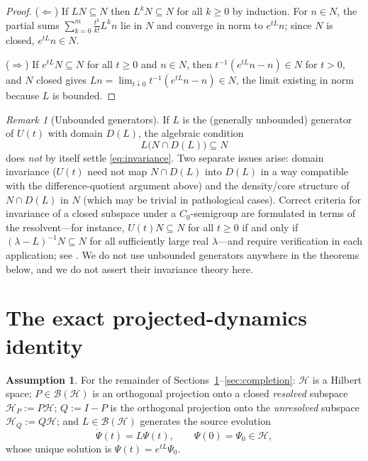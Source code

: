 \documentclass[11pt,reqno]{amsart}
\numberwithin{equation}{section}
\theoremstyle{plain}
\theoremstyle{definition}
\newtheorem{assumption}[theorem]{Assumption}
\theoremstyle{remark}
\newtheorem{remark}[theorem]{Remark}
\newcommand{\HP}{\mathcal{H}_{P}}
\newcommand{\HQ}{\mathcal{H}_{Q}}
\begin{document}
\begin{proof}
($\Leftarrow$) If $LN\subseteq N$ then $L^{k}N\subseteq N$ for all $k\ge0$ by induction. For
$n\in N$, the partial sums $\sum_{k=0}^{m}\tfrac{t^{k}}{k!}L^{k}n$ lie in $N$ and converge in
norm to $e^{tL}n$; since $N$ is closed, $e^{tL}n\in N$.

($\Rightarrow$) If $e^{tL}N\subseteq N$ for all $t\ge0$ and $n\in N$, then
$t^{-1}(e^{tL}n-n)\in N$ for $t>0$, and $N$ closed gives
$Ln=\lim_{t\downarrow0}t^{-1}(e^{tL}n-n)\in N$, the limit existing in norm because $L$ is
bounded.
\end{proof}

\begin{remark}[Unbounded generators]
\label{rem:unbdd}
If $L$ is the (generally unbounded) generator of $U(t)$ with domain $D(L)$, the algebraic
condition
\[
L\bigl(N\cap D(L)\bigr)\subseteq N
\]
does \emph{not} by itself settle \eqref{eq:invariance}. Two separate issues arise: domain
invariance ($U(t)$ need not map $N\cap D(L)$ into $D(L)$ in a way compatible with the
difference-quotient argument above) and the density/core structure of $N\cap D(L)$ in $N$
(which may be trivial in pathological cases). Correct criteria for invariance of a closed
subspace under a $C_{0}$-semigroup are formulated in terms of the resolvent---for instance,
$U(t)N\subseteq N$ for all $t\ge0$ if and only if $(\lambda-L)^{-1}N\subseteq N$ for all
sufficiently large real $\lambda$---and require verification in each application; see
\cite[\S II.2 and \S IV.2]{EngelNagel}. We do not use unbounded generators anywhere in the
theorems below, and we do not assert their invariance theory here.
\end{remark}

\section{The exact projected-dynamics identity}
\label{sec:projection}

\begin{assumption}
\label{ass:proj}
For the remainder of Sections~\ref{sec:projection}--\ref{sec:completion}: $\mathcal{H}$ is a
Hilbert space; $P\in\mathcal{B}(\mathcal{H})$ is an orthogonal projection onto a closed
\emph{resolved} subspace $\HP:=P\mathcal{H}$; $Q:=I-P$ is the orthogonal projection onto the
\emph{unresolved} subspace $\HQ:=Q\mathcal{H}$; and $L\in\mathcal{B}(\mathcal{H})$ generates
the source evolution
\begin{equation}
\label{eq:sourceeq}
\dot\Psi(t)=L\Psi(t),
\qquad
\Psi(0)=\Psi_{0}\in\mathcal{H},
\end{equation}
whose unique solution is $\Psi(t)=e^{tL}\Psi_{0}$.
\end{assumption}
\end{document}
